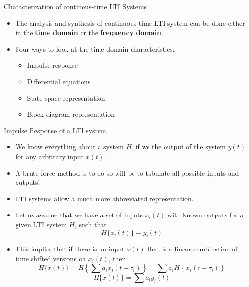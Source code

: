 \documentclass{beamer}
\begin{document}
\begin{frame}{Characterization of continous-time LTI Systems}

\begin{itemize}
\item The analysis and synthesis of continuous time LTI system can be done either in the \textbf{time domain} or the \textbf{frequency domain}.
\item Four ways to look at the time domain characteristics:
\begin{itemize}
\item Impulse response
\item Differential equations
\item State space representation
\item Block diagram representation
\end{itemize}
\end{itemize}

\end{frame}

\begin{frame}{Impulse Response of a LTI system}

\begin{itemize}
\item We know everything about a system $H$, if we the output of the system $y(t)$ for any arbitrary input $x(t)$.
\item A brute force method is to do so will be to tabulate all possible inputs and outputs!
\item \ul{LTI systems allow a much more abbreviated representation}.
\item Let us assume that we have a set of inputs $x_i(t)$ with known outputs for a given LTI system $H$, such that
\[ H\{x_i(t)\} = y_i(t)\]
\item This implies that if there is an input $x(t)$ that is a linear combination of time shifted versions on $x_i(t)$, then
\[ H\{x(t)\} = H\left\{ \sum a_ix_i(t-\tau_i) \right\} = \sum a_i H\left\{x_i(t-\tau_i)\right\} \]
\[ H\{x(t)\} = \sum a_iy_i(t)\]
\end{itemize}

\end{frame}
\end{document}
